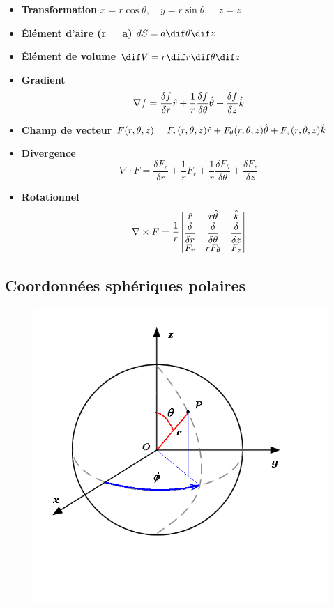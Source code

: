 \begin{itemize}
  \item{\textbf{Transformation}}
    $
    x = r\cos{\theta} , \quad y = r \sin{\theta} , \quad z = z
    $
  \item{\textbf{Élément d'aire (r = a)}}
    $
    dS = a \dif\theta \dif z
    $
  \item{\textbf{Élément de volume}}
    $
    \dif V = r \dif r \dif\theta \dif z
    $
  \item{\textbf{Gradient}}
    $$
    \nabla f = \dfrac{\delta f}{\delta r} \Hat{r} + \dfrac{1}{r} \dfrac{\delta f}{\delta \theta} \Hat{\theta} + \dfrac{\delta f}{\delta z} \Hat{k}
    $$
  \item{\textbf{Champ de vecteur}}
    $
    F(r,\theta, z) = F_r(r,\theta,z) \Hat{r} + F_\theta(r,\theta,z)\Hat{\theta} + F_z (r, \theta , z) \Hat{k}
    $
  \item{\textbf{Divergence}}
    $$
    \nabla \cdot F = \dfrac{\delta F_r}{\delta r}+ \dfrac{1}{r} F_r + \dfrac{1}{r}  \dfrac{\delta F_\theta}{\delta \theta}  + \dfrac{\delta F_z}{\delta z}
    $$
  \item{\textbf{Rotationnel}}
    $$
    \nabla \times F=\frac { 1 }{ r }
    \begin{vmatrix}
      \Hat{r} & r\Hat{\theta} & \Hat{k} \\
      \dfrac{\delta }{\delta r} & \dfrac{\delta }{\delta \theta} & \dfrac{\delta }{\delta z} \\
      F_r & rF_\theta& F_z
    \end{vmatrix}
    $$
\end{itemize}

\subsection{Coordonnées sphériques polaires}

\begin{figure}[ht!]
  \centering
  \includegraphics[scale = 0.4]{sphere.png}
\end{figure}


